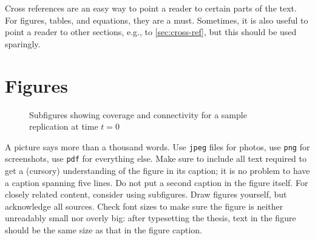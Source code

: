 \documentclass[]{ccs-thesis}
\begin{document}
{Cross references are an easy way to point a reader to certain parts of the text.
For figures, tables, and equations, they are a must.
Sometimes, it is also useful to point a reader to other sections, e.g., to \cref{sec:cross-ref}, but this should be used sparingly.

\section{Figures}

\begin{figure}%
	\centering
	\caption{Subfigures showing coverage and connectivity for a sample replication at time $t=0$}%
	\label{fig:setups12}%
\end{figure}

A picture says more than a thousand words.
Use \texttt{jpeg} files for photos, use \texttt{png} for screenshots, use \texttt{pdf} for everything else.
Make sure to include all text required to get a (cursory) understanding of the figure in its caption; it is no problem to have a caption spanning five lines.
Do not put a second caption in the figure itself.
For closely related content, consider using subfigures.
Draw figures yourself, but acknowledge all sources.
Check font sizes to make sure the figure is neither unreadably small nor overly big: after typesetting the thesis, text in the figure should be the same size as that in the figure caption.

}
\end{document}
